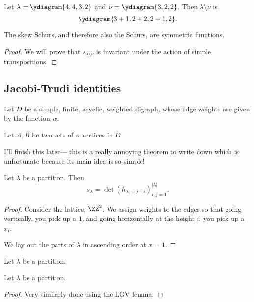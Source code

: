\documentclass{article}
\begin{document}
\begin{example}
    Let $\lambda = \ydiagram{4,4,3,2}$ and $\nu = \ydiagram{3,2,2}$. Then $\lambda \setminus \nu$ is
    \[\ydiagram{3+1,2+2,2+1,2}.\]
\end{example}

\begin{theorem} The skew Schurs, and therefore also the Schurs, are symmetric functions.
\end{theorem}

\begin{proof}
    We will prove that $s_{\lambda\setminus\nu}$ is invariant under the action of simple transpositions.


\end{proof}

\subsection{Jacobi-Trudi identities}

\begin{theorem} 
    Let $D$ be a simple, finite, acyclic, weighted digraph, whose edge weights are given by the function $w$.

    Let $A, B$ be two sets of $n$ vertices in $D$.

    I'll finish this later--- this is a really annoying theorem to write down which is unfortunate because its main idea is so simple!
\end{theorem}

\begin{theorem} Let $\lambda$ be a partition. Then
    \[
        s_\lambda = \det(h_{\lambda_i+j-i})_{i,j=1}^{|\lambda|}.
    \]
\end{theorem}

\begin{proof}
    Consider the lattice, $\ZZ^2$. We assign weights to the edges so that going vertically, you pick up a $1$, and going horizontally at the height $i$, you pick up a $x_i$.

    We lay out the parts of $\lambda$ in ascending order at $x=1$.
\end{proof}

\begin{theorem} Let $\lambda$ be a partition. 
\end{theorem}

\begin{theorem} Let $\lambda$ be a partition. 
\end{theorem}

\begin{proof}
    Very similarly done using the LGV lemma.
\end{proof}
\end{document}
